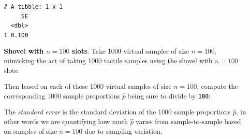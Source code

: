 \documentclass[12pt,]{krantz}
\makeatletter
\newenvironment{Shaded}{\begin{snugshade}}{\end{snugshade}}
\newcommand{\KeywordTok}[1]{\textcolor[rgb]{0.27,0.27,0.27}{\textbf{#1}}}
\newcommand{\DataTypeTok}[1]{\textcolor[rgb]{0.27,0.27,0.27}{#1}}
\newcommand{\DecValTok}[1]{\textcolor[rgb]{0.06,0.06,0.06}{#1}}
\newcommand{\StringTok}[1]{\textcolor[rgb]{0.5,0.5,0.5}{#1}}
\newcommand{\OperatorTok}[1]{\textcolor[rgb]{0.43,0.43,0.43}{\textbf{#1}}}
\newcommand{\NormalTok}[1]{#1}
\newenvironment{kframe}{%
\medskip{}
\setlength{\fboxsep}{.8em}
 \def\at@end@of@kframe{}%
 \ifinner\ifhmode%
  \def\at@end@of@kframe{\end{minipage}}%
  \begin{minipage}{\columnwidth}%
 \fi\fi%
 \def\FrameCommand##1{\hskip\@totalleftmargin \hskip-\fboxsep
 \colorbox{shadecolor}{##1}\hskip-\fboxsep
     \hskip-\linewidth \hskip-\@totalleftmargin \hskip\columnwidth}%
 \MakeFramed {\advance\hsize-\width
   \@totalleftmargin\z@ \linewidth\hsize
   \@setminipage}}%
 {\par\unskip\endMakeFramed%
 \at@end@of@kframe}
\renewenvironment{Shaded}{\begin{kframe}}{\end{kframe}}
\theoremstyle{definition}
\theoremstyle{definition}
\theoremstyle{definition}
\theoremstyle{remark}
\makeatother
\begin{document}
\begin{verbatim}
# A tibble: 1 x 1
     SE
  <dbl>
1 0.100
\end{verbatim}

\textbf{Shovel with \(n=100\) slots}: Take 1000 virtual samples of size
\(n=100\), mimicking the act of taking 1000 tactile samples using the
shovel with \(n=100\) slots:

\begin{Shaded}
\end{Shaded}

Then based on each of these 1000 virtual samples of size \(n=100\),
compute the corresponding 1000 sample proportions \(\widehat{p}\) being
sure to divide by \texttt{100}:

\begin{Shaded}
\end{Shaded}

The \emph{standard error} is the standard deviation of the 1000 sample
proportions \(\widehat{p}\), in other words we are quantifying how much
\(\widehat{p}\) varies from sample-to-sample based on samples of size
\(n=100\) due to sampling variation.

\begin{Shaded}
\end{Shaded}
\end{document}
